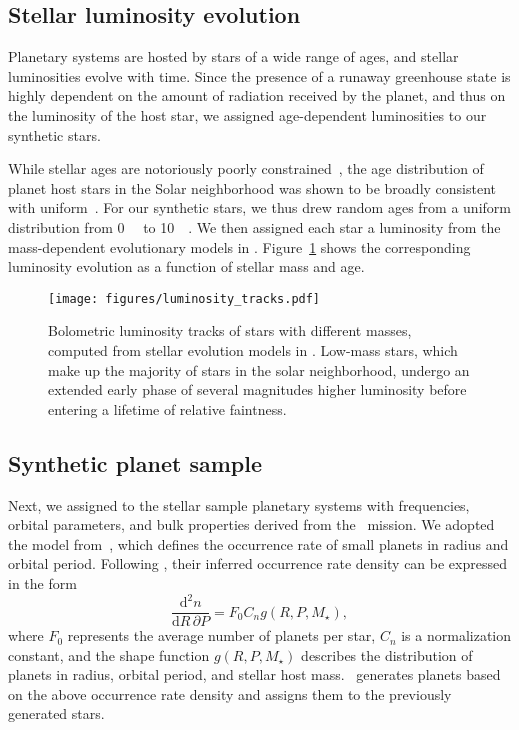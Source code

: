 \documentclass[twocolumn,twocolappendix]{aastex631}
\begin{document}
\subsection{Stellar luminosity evolution}
Planetary systems are hosted by stars of a wide range of ages, and stellar luminosities evolve with time.
Since the presence of a runaway greenhouse state is highly dependent on the amount of radiation received by the planet, and thus on the luminosity of the host star, we assigned age-dependent luminosities to our synthetic stars.

While stellar ages are notoriously poorly constrained~\cite[e.g.,][]{Adams2005}, the age distribution of planet host stars in the Solar neighborhood was shown to be broadly consistent with uniform~\citep{Reid2007,Gaidos2023}.
For our synthetic stars, we thus drew random ages from a uniform distribution from \SI{0}{\giga\year} to \SI{10}{\giga\year}.
We then assigned each star a luminosity from the mass-dependent evolutionary models in \citet{Baraffe1998}.
Figure~\ref{fig:luminosity_tracks} shows the corresponding luminosity evolution as a function of stellar mass and age.
\begin{figure}[ht!]
    \begin{centering}
        \texttt{[image: figures/luminosity\_tracks.pdf]}
        \caption{
            Bolometric luminosity tracks of stars with different masses, computed from stellar evolution models in \citet{Baraffe1998}.
            Low-mass stars, which make up the majority of stars in the solar neighborhood, undergo an extended early phase of several magnitudes higher luminosity before entering a lifetime of relative faintness.
        }
        \label{fig:luminosity_tracks}
    \end{centering}
\end{figure}


\subsection{Synthetic planet sample}\label{sec:syn_planets}
Next, we assigned to the stellar sample planetary systems with frequencies, orbital parameters, and bulk properties derived from the \kepler\ mission.
We adopted the model from~\citet{Bergsten2022}, which defines the occurrence rate of small planets in radius and orbital period.
Following \citet{Youdin2011a}, their inferred occurrence rate density can be expressed in the form
\begin{equation}
    \frac{\mathrm{d}^2n}{\mathrm{d}R \, \partial P} = F_0 C_n g(R, P, M_\star),
\end{equation}
where $F_0$ represents the average number of planets per star, $C_n$ is a normalization constant, and the shape function $g(R, P, M_\star)$ describes the distribution of planets in radius, orbital period, and stellar host mass.
\bioverse\ generates planets based on the above occurrence rate density and assigns them to the previously generated stars.
\end{document}
